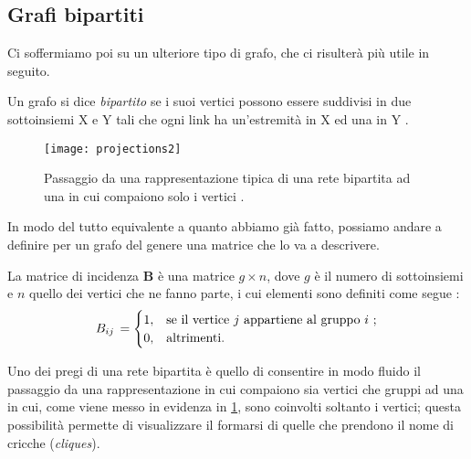 \subsection{Grafi bipartiti}
Ci soffermiamo poi su un ulteriore tipo di grafo, che ci risulterà più utile in seguito.
\begin{definizione} 
Un grafo si dice \emph{bipartito} se i suoi vertici possono essere suddivisi in due sottoinsiemi X e Y tali che ogni link ha un'estremità in X ed una in Y \cite{Bondy}. 
\end{definizione}
\begin{figure}[h]
	\begin{center}
		\texttt{[image: projections2]}
		\caption{Passaggio da una rappresentazione tipica di una rete bipartita ad una in cui compaiono solo i vertici \cite{Newman}.}
		\label{fig:proj2}
	\end{center}
\end{figure}
%
In modo del tutto equivalente a quanto abbiamo già fatto, possiamo andare a definire per un grafo del genere una matrice che lo va a descrivere.
\begin{definizione}
La matrice di incidenza \textbf{B} è una matrice $ g \times n $, dove $ g $ è il numero di sottoinsiemi e $ n $ quello dei vertici che ne fanno parte, i cui elementi sono definiti come segue \cite{Newman}:
\[
B_{ij} \, =
\begin{cases}
1, & \text{se il vertice $ j $ appartiene al gruppo $ i $ };\\
0, & \text{altrimenti}.
\end{cases}
\]
\end{definizione}
%
Uno dei pregi di una rete bipartita è quello di consentire in modo fluido il passaggio da una rappresentazione in cui compaiono sia vertici che gruppi ad una in cui, come viene messo in evidenza in \cref{fig:proj2}, sono coinvolti soltanto i vertici; questa possibilità permette di visualizzare il formarsi di quelle che prendono il nome di cricche (\emph{cliques}).
